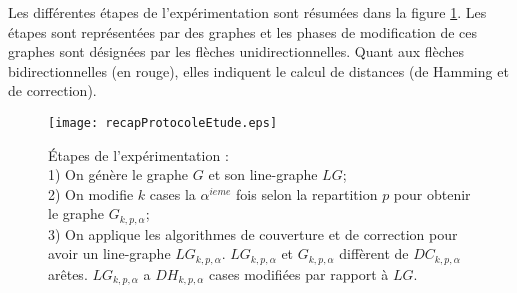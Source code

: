 Les diff\'erentes \'etapes de l'exp\'erimentation sont r\'esum\'ees dans la figure \ref{recapProtocoleEtude}. Les \'etapes sont repr\'esent\'ees par des graphes et les phases de modification de ces graphes sont d\'esign\'ees par les fl\`eches unidirectionnelles. Quant aux fl\`eches bidirectionnelles (en rouge), elles indiquent le calcul de distances (de Hamming et de correction). 
\begin{figure}[htb!] 
\centering
\texttt{[image: recapProtocoleEtude.eps]}
\caption{\'Etapes de l'exp\'erimentation :  \\
1) On g\'en\`ere le graphe $G$ et son line-graphe $LG$;\\ 
2) On modifie $k$ cases la $\alpha^{ieme}$ fois selon la repartition $p$ pour obtenir le graphe $G_{k,p,\alpha}$;\\ 
3) On applique les algorithmes de couverture et de correction pour avoir un line-graphe $LG_{k,p,\alpha}$. $LG_{k,p,\alpha}$ et  $G_{k,p,\alpha}$ diff\`erent de $DC_{k,p,\alpha}$ ar\^etes. $LG_{k,p,\alpha}$ a $DH_{k,p,\alpha}$ cases modifi\'ees par rapport \`a $LG$. 
 }
\label{recapProtocoleEtude} 
\end{figure}
\newline


